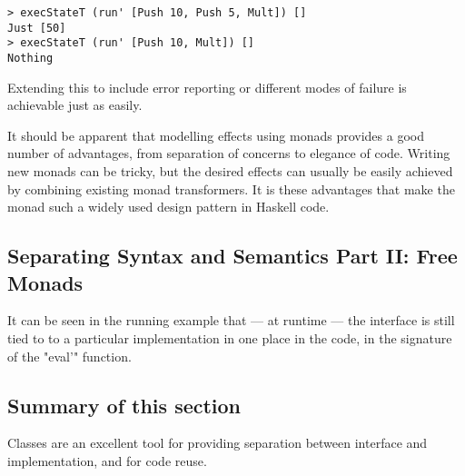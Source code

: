 \begin{verbatim}
> execStateT (run' [Push 10, Push 5, Mult]) []
Just [50]
> execStateT (run' [Push 10, Mult]) []
Nothing
\end{verbatim}

\noindent Extending this to include error reporting or different modes of failure is achievable just as easily.

It should be apparent that modelling effects using monads provides a good number of advantages, from separation of concerns to elegance of code. Writing new monads can be tricky, but the desired effects can usually be easily achieved by combining existing monad transformers. It is these advantages that make the monad such a widely used design pattern in Haskell code.

\subsection{Separating Syntax and Semantics Part II: Free Monads}

It can be seen in the running example that --- at runtime --- the interface is still tied to to a particular implementation in one place in the code, in the signature of the "eval'" function. 

\subsection{Summary of this section} Classes are an excellent tool for providing separation between interface and implementation, and for code reuse.


